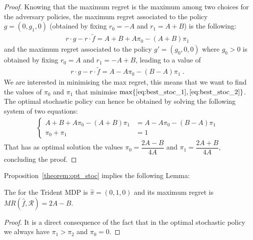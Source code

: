 \begin{proof}
Knowing that the maximum regret is the maximum among two choices for the adversary policies, the maximum regret associated to the policy $g =(0, g_1, 0)$ (obtained by fixing $r_0 = -A$ and $r_1 = A+B$) is the following:
\begin{align}
r \cdot g - r \cdot \tilde{f} = A + B +A \pi_0 -(A+B)\pi_1 \label{eq:best_stoc_1}
\end{align}   
and the maximum regret associated to the policy $g' = (g_0, 0, 0)$ where $g_0 > 0$ is obtained by fixing $r_0 = A$ and $r_1 = -A+B$, leading to a value of
\begin{align}
r \cdot g - r \cdot \tilde{f}  = A - A \pi_0 -(B-A)\pi_1 \label{eq:best_stoc_2}\;.
\end{align}   
We are interested in minimising the max regret, this means that we want to find the values of $\pi_0$ and $\pi_1$ that minimise $\max \{\eqref{eq:best_stoc_1}, \eqref{eq:best_stoc_2}\}$. The optimal stochastic policy can hence be obtained by solving the following system of two equations: 
\begin{align*}
\left\{
\begin{array}{ll}
A + B +A \pi_0 -(A+B)\pi_1 &= A - A \pi_0 -(B-A)\pi_1\\
\pi_0+\pi_1 &= 1
\end{array}
\right.
\end{align*} 
That has as optimal solution the values $\pi_{0}=\dfrac{2A - B}{4A}$ and $\pi_{1}=\dfrac{2A + B}{4A}$, concluding the proof.
\end{proof}


Proposition~\ref{theorem:opt_stoc} implies the following Lemma:
\begin{lemma}\label{lemma:heur_policy}
The  for the Trident MDP is $\hat{\pi} = (0, 1, 0)$ %
and its maximum regret is $MR(\hat{f}, \mathcal{R}) = 2A-B$.
\end{lemma}
\begin{proof}
It is a direct consequence of the fact that in the optimal stochastic policy we always have $\pi_1 > \pi_2$ and $\pi_0 = 0$.
\end{proof}

